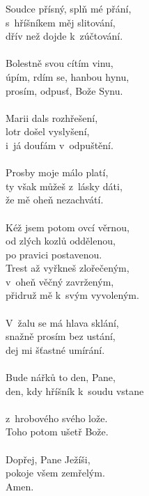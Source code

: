 \begin{translatioMulticol}{4}
Soudce přísný, splň mé přání, \\
s~hříšníkem měj slitování, \\
dřív než dojde k~zúčtování. \\
\\
Bolestně svou cítím vinu, \\
úpím, rdím se, hanbou hynu, \\
prosím, odpusť, Bože Synu. \\
\\
Marii dals rozhřešení, \\
lotr došel vyslyšení, \\
i~já doufám v~odpuštění. \\
\\
Prosby moje málo platí, \\
ty však můžeš z~lásky dáti, \\
že mě oheň nezachvátí. \\
\\
Kéž jsem potom ovcí věrnou, \\
od zlých kozlů oddělenou, \\
po pravici postavenou. \\

Trest až vyřkneš zlořečeným, \\
v~oheň věčný zavrženým, \\
přidruž mě k~svým vyvoleným. \\
\\
V~žalu se má hlava sklání, \\
snažně prosím bez ustání, \\
dej mi šťastné umírání. \\
\\
Bude nářků to den, Pane, \\
den, kdy hříšník k~soudu vstane \\
\\
z~hrobového svého lože. \\
Toho potom ušetř Bože. \\
\\
Dopřej, Pane Ježíši, \\
pokoje všem zemřelým. \\
Amen.
\end{translatioMulticol}
